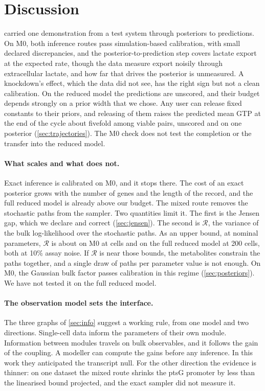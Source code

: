 \section{Discussion}
\label{sec:discussion}

\IC{} carried one demonstration from a test system through posteriors to predictions. On M0, both inference routes pass simulation-based calibration, with small
declared discrepancies, and the posterior-to-prediction step covers lactate export at the expected rate, though the data measure export noisily through extracellular lactate, and how far that drives the posterior is unmeasured. A knockdown's effect, which the data did not see, has the right sign but not a clean calibration. On the reduced model the predictions are unscored, and their budget depends strongly on
a prior width that we chose. Any user can release fixed constants to their priors, and releasing  of them raises the predicted mean GTP at the end of the cycle about fivefold among viable pairs, unscored and on one posterior (\cref{sec:trajectories}). The M0 check does not test the completion or the transfer into the reduced model.

\paragraph{What scales and what does not.} Exact inference is calibrated on M0, and it stops there. The cost of an exact posterior grows with
the number of genes and the length of the record, and the full reduced model is
already above our budget. The mixed route removes the stochastic paths from
the sampler. Two quantities limit it. The first is the Jensen gap, which we declare
and correct (\cref{sec:jensen}). The second is $\mathcal{R}$, the variance of the bulk log-likelihood over the stochastic paths. As an upper bound, at nominal parameters, $\mathcal{R}$ is about  on M0 at  cells and  on the full reduced model at 200 cells, both at 10\% assay noise. If $\mathcal{R}$ is near those bounds, the metabolites constrain the paths together, and a single draw of paths per parameter value is not enough. On M0, the Gaussian bulk factor passes calibration
in this regime (\cref{sec:posteriors}). We have not tested it on the full reduced model.

\paragraph{The observation model sets the interface.} The three graphs of
\cref{sec:info} suggest a working rule, from one model and two directions. Single-cell data inform the parameters of their
own module. Information between modules travels on bulk observables, and it follows
the gain of the coupling. A modeller can compute the gains before any inference. In this work they anticipated the transcript null. For the other direction the evidence is thinner: on one dataset the mixed route shrinks the ptsG promoter by less than the linearised bound projected, and the exact sampler did not measure it.

